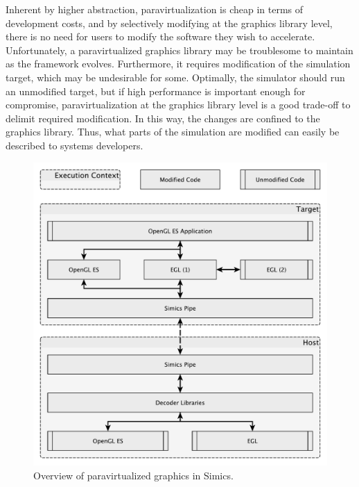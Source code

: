 Inherent by higher abstraction, paravirtualization is cheap in terms of development costs, and by selectively modifying at the graphics library level, there is no need for users to modify the software they wish to accelerate.
Unfortunately, a paravirtualized graphics library may be troublesome to maintain as the framework evolves.
Furthermore, it requires modification of the simulation target, which may be undesirable for some.
Optimally, the simulator should run an unmodified target, but if high performance is important enough for compromise, paravirtualization at the graphics library level is a good trade-off to delimit required modification.
In this way, the changes are confined to the graphics library.
Thus, what parts of the simulation are modified can easily be described to systems developers.

\begin{figure}
\centering
\includegraphics[width=\linewidth]{img/yedoverview.pdf}
\caption{Overview of paravirtualized graphics in Simics.}
\label{fig:overview}
\end{figure}
